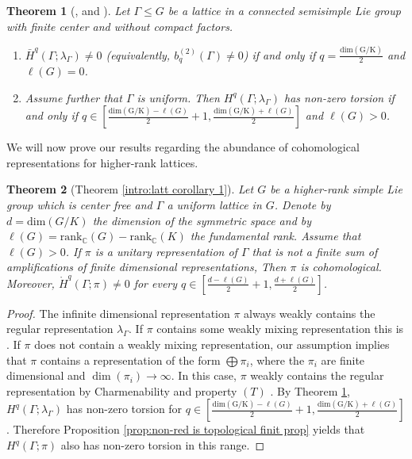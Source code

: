 \documentclass[12pt,reqno]{amsart}
\newtheorem{theorem}{Theorem}[section]
\theoremstyle{definition}
\newcommand{\torH}{\mathring{H}}
\begin{document}
\begin{theorem}[{\cite{CheegerGromov}, \cite[Section~11]{LohoueSalah} and \cite[Theorem~1.1]{Olbrich}}]\label{thm:l2 invariants}
   Let $\Gamma \leq G$ be a lattice in a connected semisimple Lie group with finite center and without compact factors.  
    \begin{enumerate}
        \item $\bar{H}^q(\Gamma;\lambda_\Gamma) \ne 0$ (equivalently, $b^{(2)}_q(\Gamma) \ne 0$) if and only if  $q=\frac{\mathrm{dim(G/K)}}{2}$ and $\ell(G)=0$.
        \item Assume further that $\Gamma$ is uniform. Then $H^q(\Gamma;\lambda_\Gamma)$ has non-zero torsion if and only if $q \in [\frac{\mathrm{dim(G/K)}-\ell(G)}{2}+1,\frac{\mathrm{dim(G/K)}+\ell(G)}{2}]$ and $\ell(G)>0$.
    \end{enumerate}
\end{theorem}
 We will now prove our results regarding the abundance of cohomological representations for higher-rank lattices.
\begin{theorem}[Theorem \ref{intro:latt corollary 1}]
    Let $G$ be a higher-rank simple Lie group which is center free and $\Gamma$ a uniform lattice in $G$. Denote by $d=\mathrm{dim}(G/K)$ the dimension of the symmetric space and by $\ell(G)=\mathrm{rank}_\mathbb{C}(G)-\mathrm{rank}_\mathbb{C}(K)$ the fundamental rank. Assume that $\ell(G)>0$. If $\pi$ is a unitary representation of $\Gamma$ that is not a finite sum of amplifications of finite dimensional representations, Then $\pi$ is cohomological. Moreover, $\torH^q(\Gamma;\pi) \ne 0$ for every $q \in [\frac{d-\ell(G)}{2}+1,\frac{d+\ell(G)}{2}]$.
\end{theorem}
\begin{proof}
    The infinite dimensional representation $\pi$ always weakly contains the regular representation $\lambda_\Gamma$. If $\pi$ contains some weakly mixing representation this is \cite[Corollary~D]{BoutHoud}. If $\pi$ does not contain a weakly mixing representation, our assumption implies that $\pi$ contains a representation of the form $\bigoplus \pi_i$, where the $\pi_i$ are finite dimensional and $\dim(\pi_i) \rightarrow \infty$. In this case, $\pi$ weakly contains the regular representation by Charmenability and property $(T)$ \cite[Theorem~1.3]{LevitSlutskiVigdorovich}. By Theorem \ref{thm:l2 invariants}, $H^q(\Gamma;\lambda_{\Gamma})$ has non-zero torsion for $q \in [\frac{\mathrm{dim(G/K)}-\ell(G)}{2}+1,\frac{\mathrm{dim(G/K)}+\ell(G)}{2}]$. Therefore Proposition \ref{prop:non-red is topological finit prop} yields that $H^q(\Gamma;\pi)$ also has non-zero torsion in this range. 
\end{proof}
\end{document}
